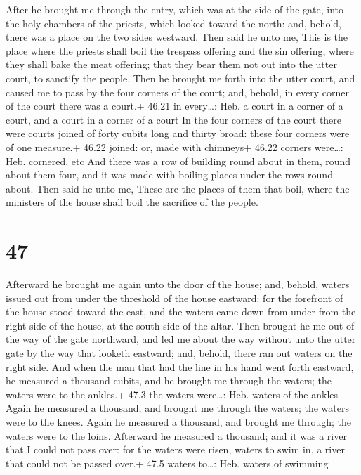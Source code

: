  After he brought me through the entry, which was at the
side of the gate, into the holy chambers of the priests, which looked
toward the north: and, behold, there was a place on the two sides
westward.  Then said he unto me, This is the place where
the priests shall boil the trespass offering and the sin offering, where
they shall bake the meat offering; that they bear them not out into the
utter court, to sanctify the people.  Then he brought me
forth into the utter court, and caused me to pass by the four corners of
the court; and, behold, in every corner of the court there was a court.+
46.21 in every\ldots: Heb. a court in a corner of a court, and a court
in a corner of a court  In the four corners of the court
there were courts joined of forty cubits long and thirty broad: these
four corners were of one measure.+ 46.22 joined: or, made with chimneys+
46.22 corners were\ldots: Heb. cornered, etc  And there was
a row of building round about in them, round about them four, and it was
made with boiling places under the rows round about.  Then
said he unto me, These are the places of them that boil, where the
ministers of the house shall boil the sacrifice of the people.

\hypertarget{section-46}{%
\section{47}\label{section-46}}

 Afterward he brought me again unto the door of the house;
and, behold, waters issued out from under the threshold of the house
eastward: for the forefront of the house stood toward the east, and the
waters came down from under from the right side of the house, at the
south side of the altar.  Then brought he me out of the way
of the gate northward, and led me about the way without unto the utter
gate by the way that looketh eastward; and, behold, there ran out waters
on the right side.  And when the man that had the line in
his hand went forth eastward, he measured a thousand cubits, and he
brought me through the waters; the waters were to the ankles.+ 47.3 the
waters were\ldots: Heb. waters of the ankles  Again he
measured a thousand, and brought me through the waters; the waters were
to the knees. Again he measured a thousand, and brought me through; the
waters were to the loins.  Afterward he measured a thousand;
and it was a river that I could not pass over: for the waters were
risen, waters to swim in, a river that could not be passed over.+ 47.5
waters to\ldots: Heb. waters of swimming

